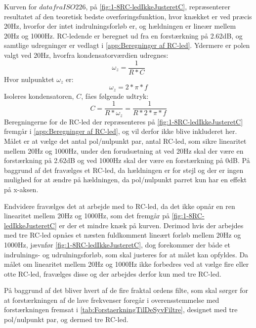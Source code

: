 \noindent
%
Kurven for $data fra ISO226$, på \autoref{fig:1-8RC-ledIkkeJusteretC}, repræsenterer resultatet af den teoretisk bedste overføringsfunktion, hvor knækket er ved præcis 20Hz, hvorfor der intet indrulningsforløb er, og hældningen er lineær mellem 20Hz og 1000Hz. RC-ledende er beregnet ud fra en forstærkning på 2.62dB, og samtlige udregninger er vedlagt i \autoref{app:Beregninger af RC-led}. Ydermere er polen valgt ved 20Hz, hvorfra kondensatorværdien udregnes:
%
\begin{equation}
	\omega_z = \frac{1}{R*C}		
\end{equation}  
%
Hvor nulpunktet $\omega_z$ er:
%
\begin{equation}
	\omega_z = 2*\pi*f 
\end{equation}
%
Isoleres kondensatoren, $C$, fåes følgende udtryk:
%
\begin{equation}
	C = \frac{1}{R*\omega_z} = \frac{1}{R*2*\pi*f}
\end{equation} 
%
Beregningerne for de RC-led der repræsenteres på \autoref{fig:1-8RC-ledIkkeJusteretC} fremgår i \autoref{app:Beregninger af RC-led}, og vil derfor ikke blive inkluderet her. Målet er at vælge det antal pol/nulpunkt par, antal RC-led, som sikre linearitet mellem 20Hz og 1000Hz, under den forudsætning at ved 20Hz skal der være en forstærkning på 2.62dB og ved 1000Hz skal der være en forstærkning på 0dB. På baggrund af det fravælges et RC-led, da hældningen er for stejl og der er ingen mulighed for at ændre på hældningen, da pol/nulpunkt parret kun har en effekt på x-aksen. 

Endvidere fravælges det at arbejde med to RC-led, da det ikke opnår en ren linearitet mellem 20Hz og 1000Hz, som det fremgår på \autoref{fig:1-8RC-ledIkkeJusteretC} er der et mindre knæk på kurven. Derimod hvis der arbejdes med tre RC-led opnåes et næsten fuldkomment lineært forløb mellem 20Hz og 1000Hz, jævnfør \autoref{fig:1-8RC-ledIkkeJusteretC}, dog forekommer der både et indrulnings- og udrulningsforløb, som skal justeres for at målet kan opfyldes. Da målet om linearitet mellem 20Hz og 1000Hz ikke forbedres ved at vælge fire eller otte RC-led, fravælges disse og der arbejdes derfor kun med tre RC-led.

På baggrund af det bliver hvert af de fire fraktal ordens filte, som skal sørger for at forstærkningen af de lave frekvenser foregår i overensstemmelse med forstærkningen fremsat i \autoref{tab:ForstaerkningTilDeSyvFiltre}, designet med  tre pol/nulpunkt par, og dermed tre RC-led.
%
\newpage
\noindent
% 